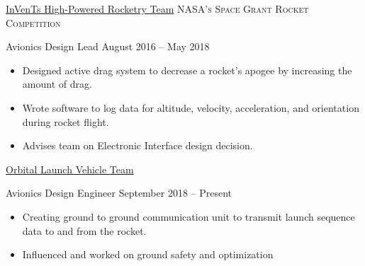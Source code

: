 \documentclass[10pt,a4paper]{article}
\begin{document}

\vspace{-0.2em}


\headedsection
  {\href{https://spacegrant.carthage.edu/funding-programs/undergraduate/rocket-competitions/regional/}{InVenTs High-Powered Rocketry Team}}
  {\small\textsc{NASA's Space Grant Rocket Competition}} {

  \headedsubsection
    {Avionics Design Lead}
    {August 2016 -- May 2018}
    {\begin{itemize}
        \item Designed active drag system to decrease a rocket's apogee by increasing the amount of drag.
        \item Wrote software to log data for altitude, velocity, acceleration, and orientation during rocket flight.
        \item Advises team on Electronic Interface design decision.
    \end{itemize}}
}


\vspace{-0.2em}

\headedsection
  {\href{https://olvt.org/}{Orbital Launch Vehicle Team}}
  {} {

  \headedsubsection
    {Avionics Design Engineer}
    {September 2018 -- Present}
    {\begin{itemize}
        \item Creating ground to ground communication unit to transmit launch sequence data to and from the rocket.
        \item Influenced and worked on ground safety and optimization 
    \end{itemize}}
}



\smallskip
\spacedhrule{-0.2em}{-0.4em}
\end{document}
